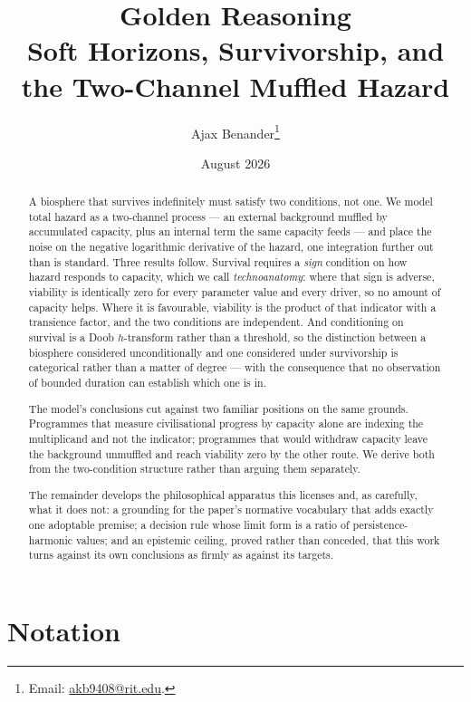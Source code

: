 \documentclass[11pt]{article}
\title{Golden Reasoning\\[4pt]
\large Soft Horizons, Survivorship, and the Two-Channel Muffled Hazard}
\author{Ajax Benander\thanks{Email: \href{mailto:akb9408@rit.edu}{akb9408@rit.edu}.}}
\date{August 2026}
\numberwithin{equation}{section}
\theoremstyle{plain}
\theoremstyle{definition}
\theoremstyle{remark}
\begin{document}
\maketitle

\begin{abstract}\small
\noindent A biosphere that survives indefinitely must satisfy two
conditions, not one. We model total hazard as a two-channel process ---
an external background muffled by accumulated capacity, plus an internal
term the same capacity feeds --- and place the noise on the negative
logarithmic derivative of the hazard, one integration further out than
is standard. Three results follow. Survival requires a \emph{sign}
condition on how hazard responds to capacity, which we call
\emph{technoanatomy}: where that sign is adverse, viability is
identically zero for every parameter value and every driver, so no
amount of capacity helps. Where it is favourable, viability is the
product of that indicator with a transience factor, and the two
conditions are independent. And conditioning on survival is a Doob
$h$-transform rather than a threshold, so the distinction between a
biosphere considered unconditionally and one considered under
survivorship is categorical rather than a matter of degree --- with the
consequence that no observation of bounded duration can establish which
one is in.

The model's conclusions cut against two familiar positions on the same
grounds. Programmes that measure civilisational progress by capacity
alone are indexing the multiplicand and not the indicator; programmes
that would withdraw capacity leave the background unmuffled and reach
viability zero by the other route. We derive both from the two-condition
structure rather than arguing them separately.

The remainder develops the philosophical apparatus this licenses and, as
carefully, what it does not: a grounding for the paper's normative
vocabulary that adds exactly one adoptable premise; a decision rule whose
limit form is a ratio of persistence-harmonic values; and an epistemic
ceiling, proved rather than conceded, that this work turns against its own
conclusions as firmly as against its targets.
\end{abstract}

\tableofcontents
\bigskip

\section*{Notation}\label{sec:notation}
\end{document}
